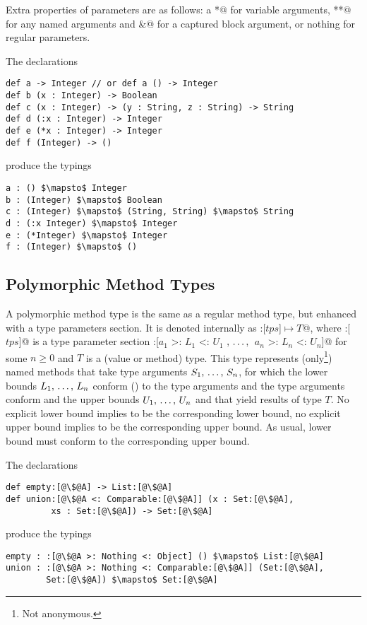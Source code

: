 Extra properties of parameters are as follows: a \lstinline@*@ for variable arguments, \lstinline@**@ for any named arguments and \lstinline@&@ for a captured block argument, or nothing for regular parameters. 

\example The declarations
\begin{lstlisting}
def a -> Integer // or def a () -> Integer
def b (x : Integer) -> Boolean
def c (x : Integer) -> (y : String, z : String) -> String
def d (:x : Integer) -> Integer
def e (*x : Integer) -> Integer
def f (Integer) -> ()
\end{lstlisting}
produce the typings
\begin{lstlisting}
a : () $\mapsto$ Integer
b : (Integer) $\mapsto$ Boolean
c : (Integer) $\mapsto$ (String, String) $\mapsto$ String
d : (:x Integer) $\mapsto$ Integer
e : (*Integer) $\mapsto$ Integer
f : (Integer) $\mapsto$ ()
\end{lstlisting}

\subsection{Polymorphic Method Types}
\label{sec:polymorphic-method-types}

A polymorphic method type is the same as a regular method type, but enhanced with a type parameters section. It is denoted internally as \lstinline@:[$tps$]$ \mapsto T$@, where \lstinline@:[$tps$]@ is a type parameter section \lstinline@:[$a_1$ >: $L_1$ <: $U_1$ $,\, \ldots ,\,$ $a_n$ >: $L_n$ <: $U_n$]@ for some $n \geq 0$ and $T$ is a (value or method) type. This type represents (only\footnote{Not anonymous.}) named methods that take type arguments $S_1 ,\, \ldots ,\, S_n$, for which the lower bounds $L_1 ,\, \ldots ,\, L_n$ conform () to the type arguments and the type arguments conform and the upper bounds $U_1 ,\, \ldots ,\, U_n$ and that yield results of type $T$. No explicit lower bound implies  to be the corresponding lower bound, no explicit upper bound implies  to be the corresponding upper bound. As usual, lower bound must conform to the corresponding upper bound. 

\example The declarations
\begin{lstlisting}[escapechar=@,deletekeywords={union}]
def empty:[@\$@A] -> List:[@\$@A]
def union:[@\$@A <: Comparable:[@\$@A]] (x : Set:[@\$@A], 
         xs : Set:[@\$@A]) -> Set:[@\$@A]
\end{lstlisting}
produce the typings
\begin{lstlisting}[escapechar=@,deletekeywords={union}]
empty : :[@\$@A >: Nothing <: Object] () $\mapsto$ List:[@\$@A]
union : :[@\$@A >: Nothing <: Comparable:[@\$@A]] (Set:[@\$@A], 
        Set:[@\$@A]) $\mapsto$ Set:[@\$@A]
\end{lstlisting}

